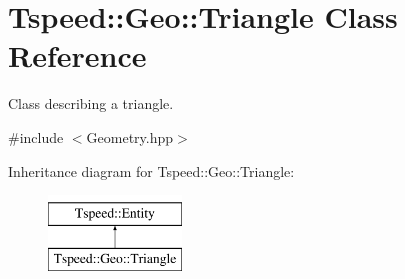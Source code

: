 \hypertarget{classTspeed_1_1Geo_1_1Triangle}{\section{Tspeed\-:\-:Geo\-:\-:Triangle Class Reference}
\label{classTspeed_1_1Geo_1_1Triangle}
}


Class describing a triangle.  




{\ttfamily \#include $<$Geometry.\-hpp$>$}

Inheritance diagram for Tspeed\-:\-:Geo\-:\-:Triangle\-:\begin{figure}[H]
\begin{center}
\leavevmode
\includegraphics[height=2.000000cm]{classTspeed_1_1Geo_1_1Triangle}
\end{center}
\end{figure}
